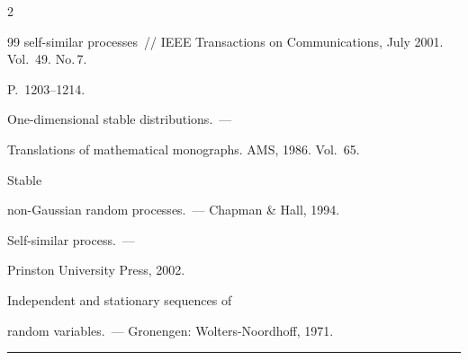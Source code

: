 \begin{multicols}{2}
{{\begin{thebibliography}{99}
self-similar processes~// IEEE Transactions on  Communications, July 2001. Vol.~49. No.\,7. 

P.~1203--1214.






 One-dimensional stable distributions.~--- 

Translations of mathematical monographs.  AMS, 1986. Vol.~65.




 Stable

non-Gaussian random processes.~---  Chapman \& Hall, 1994. 




 Self-similar process.~---

Prinston University Press, 2002. 




  Independent and stationary sequences of 

random variables.~--- Gronengen: Wolters-Noordhoff, 1971. 



 \end{thebibliography}

}

}





\end{multicols}



\vspace*{3pt}



\hrule








\def\tit{ДРОБНОЕ ДВИЖЕНИЕ ЛЕВИ С~ЗАВИСИМЫМИ ПРИРАЩЕНИЯМИ 

И~ЕГО~ПРИЛОЖЕНИЕ К~МОДЕЛИРОВАНИЮ СЕТЕВОГО  ТРАФИКА}



\def\aut{К.~Де~Никола$^1$, Ю.\,С.~Хохлов$^2$,  М.~Пагано$^3$,  О.\,И.~Сидорова$^4$}




